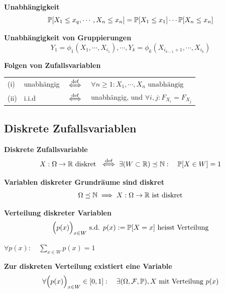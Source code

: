  \textbf{Unabhängigkeit}\\
$$
    \P[X_1 \leq x_q,\cdots, X_n \leq x_n] = \P[X_1 \leq x_1] \cdots \P[X_n \leq x_n]
$$

\newpage

\theorem \textbf{Unabhängigkeit von Gruppierungen}\\
$$
    Y_1 = \phi_1(X_1,\cdots,X_{i_1}), \cdots , Y_k = \phi_k(X_{i_{k-1}+1},\cdots,X_{i_k})
$$

 \textbf{Folgen von Zufallsvariablen}

\begin{tabular}{llll}
    (i)     & unabhängig & $\iffdef$ & $\forall n \geq 1: X_1,\cdots,X_n \text{ unabhängig}$ \\
    (ii)    & i.i.d      & $\iffdef$ & unabhängig, und $\forall i, j: F_{X_i} = F_{X_j}$
\end{tabular}


\subsection{Diskrete Zufallsvariablen}

 \textbf{Diskrete Zufallsvariable}
$$
    X: \Omega \to \R \text{ diskret } \iffdef \exists (W \subset \R) \preceq \N:\quad \P[X \in W] = 1
$$

\lemma \textbf{Variablen diskreter Grundräume sind diskret}
$$
    \Omega \preceq \N \implies X: \Omega \to \R \text{ ist diskret}
$$

 \textbf{Verteilung diskreter Variablen}
$$
    \Bigl( p(x) \Bigr)_{x \in W} \text{ s.d. } p(x) := \P[X = x] \text{ heisst Verteilung}
$$

\theorem $\forall p(x):\quad \displaystyle\sum_{x \in W} p(x) = 1$ 

\lemma \textbf{Zur diskreten Verteilung existiert eine Variable}
$$
    \forall \Bigl( p(x) \Bigr)_{x \in W} \in [0,1]:\quad \exists (\Omega, \F, \P), X \text{ mit Verteilung } p(x)
$$

